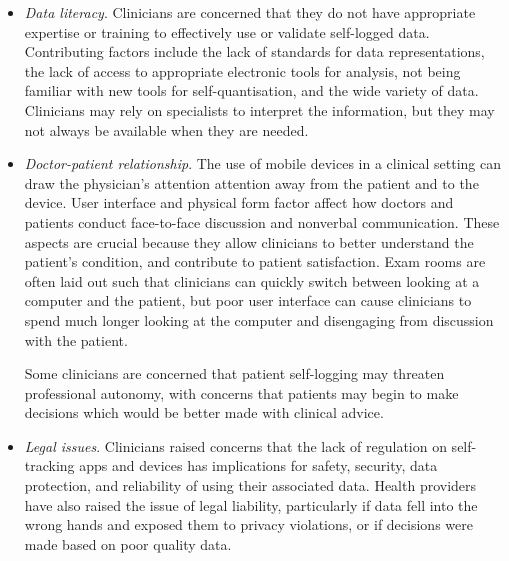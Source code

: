 \documentclass{sigchi}
\begin{document}
\begin{itemize}
    
    \item \textit{Data literacy}. Clinicians are concerned that they do not have appropriate expertise or training to effectively use or validate self-logged data. Contributing factors include the lack of standards for data representations, the lack of access to appropriate electronic tools for analysis, not being familiar with new tools for self-quantisation, and the wide variety of data. Clinicians may rely on specialists to interpret the information, but they may not always be available when they are needed.
    
    \item \textit{Doctor-patient relationship}. The use of mobile devices in a clinical setting can draw the physician's attention attention away from the patient and to the device. User interface and physical form factor affect how doctors and patients conduct face-to-face discussion and nonverbal communication. These aspects are crucial because they allow clinicians to better understand the patient's condition, and contribute to patient satisfaction. Exam rooms are often laid out such that clinicians can quickly switch between looking at a computer and the patient, but poor user interface can cause clinicians to spend much longer looking at the computer and disengaging from discussion with the patient. 
    
    Some clinicians are concerned that patient self-logging may threaten professional autonomy, with concerns that patients may begin to make decisions which would be better made with clinical advice.

    
    
    \item \textit{Legal issues}. Clinicians raised concerns that the lack of regulation on self-tracking apps and devices has implications for safety, security, data protection, and reliability of using their associated data. Health providers have also raised the issue of legal liability, particularly if data fell into the wrong hands and exposed them to privacy violations, or if decisions were made based on poor quality data.
\end{itemize}
\end{document}
